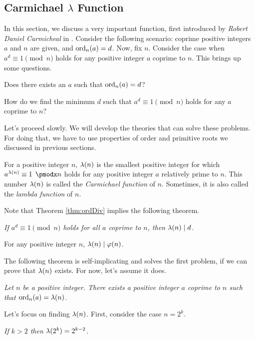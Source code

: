 \documentclass{subfile}
\begin{document}
	\subsection{Carmichael $\lambda$ Function}
	In this section, we discuss a very important function, first introduced by \textit{Robert Daniel Carmicheal} in  \cite{ch:congruence-carmichael-original}. Consider the following scenario: coprime positive integers $a$ and $n$ are given, and $\operatorname{ord}_n(a)=d$. Now, fix $n$. Consider the case when $a^d\equiv1\pmod n$ holds for any positive integer $a$ coprime to $n$. This brings up some questions.
	\begin{problem}\label{prob:CarmichaelQuestion1}
		Does there exists an $a$ such that $\operatorname{ord}_n(a)=d$?
	\end{problem}
	
	\begin{problem}\label{prob:CarmichaelQuestion2}
		How do we find the minimum $d$ such that $a^d\equiv1\pmod n$ holds for any $a$ coprime to $n$?
	\end{problem}
	Let's proceed slowly. We will develop the theories that can solve these problems. For doing that, we have to use properties of order and primitive roots we discussed in previous sections.
	\begin{definition}
		For a positive integer $n$, $\lambda(n)$ is the smallest positive integer for which $a^{\l(n)}\equiv1\pmod n$ holds for any positive integer $a$ relatively prime to $n$. This number $\lambda(n)$ is called the \textit{Carmichael function} of $n$. Sometimes, it is also called the \textit{lambda function} of $n$.
	\end{definition}
	Note that Theorem \eqref{thm:ordDiv} implies the following theorem.
	\begin{theorem}\slshape\label{thm:carDiv}
		If $a^d\equiv1\pmod n$ holds for all $a$ coprime to $n$, then $\lambda(n)\mid d$.
	\end{theorem}
	
	\begin{corollary}\label{cor:LambdaDividesPhi}
		For any positive integer $n$, $\lambda(n)\mid \varphi(n)$.
	\end{corollary}
	The following theorem is self-implicating and solves the first problem, if we can prove that $\lambda(n)$ exists. For now, let's assume it does.
	\begin{theorem}\slshape
		Let $n$ be a positive integer. There exists a positive integer $a$ coprime to $n$ such that $\operatorname{ord}_n(a)=\lambda(n)$.
	\end{theorem}
	Let's focus on finding $\lambda(n)$. First, consider the case $n=2^k$.
	\begin{theorem}\slshape
		If $k>2$ then $\lambda(2^k)=2^{k-2}$.
	\end{theorem}
	
\end{document}
